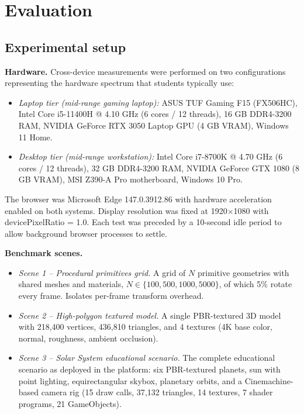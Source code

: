 \section{Evaluation}

\subsection{Experimental setup}
\textbf{Hardware.} Cross-device measurements were performed on two configurations representing the hardware spectrum that students typically use:
\begin{itemize}[leftmargin=1.4em]
    \item \textit{Laptop tier (mid-range gaming laptop):} ASUS TUF Gaming F15 (FX506HC), Intel Core i5-11400H @ 4.10 GHz (6 cores / 12 threads), 16 GB DDR4-3200 RAM, NVIDIA GeForce RTX 3050 Laptop GPU (4 GB VRAM), Windows 11 Home.

    \item \textit{Desktop tier (mid-range workstation):} Intel Core i7-8700K @ 4.70 GHz (6 cores / 12 threads), 32 GB DDR4-3200 RAM, NVIDIA GeForce GTX 1080 (8 GB VRAM), MSI Z390-A Pro motherboard, Windows 10 Pro.
\end{itemize}
The browser was Microsoft Edge 147.0.3912.86 with hardware acceleration enabled on both systems. Display resolution was fixed at 1920$\times$1080 with devicePixelRatio = 1.0. Each test was preceded by a 10-second idle period to allow background browser processes to settle.

\textbf{Benchmark scenes.}
\begin{itemize}[leftmargin=1.4em]
    \item \textit{Scene 1 -- Procedural primitives grid.} A grid of $N$ primitive geometries with shared meshes and materials, $N \in \{100, 500, 1000, 5000\}$, of which 5\% rotate every frame. Isolates per-frame transform overhead.
    \item \textit{Scene 2 -- High-polygon textured model.} A single PBR-textured 3D model with 218{,}400 vertices, 436{,}810 triangles, and 4 textures (4K base color, normal, roughness, ambient occlusion).
    \item \textit{Scene 3 -- Solar System educational scenario.} The complete educational scenario as deployed in the platform: six PBR-textured planets, sun with point lighting, equirectangular skybox, planetary orbits, and a Cinemachine-based camera rig (15 draw calls, 37{,}132 triangles, 14 textures, 7 shader programs, 21 GameObjects).
\end{itemize}

